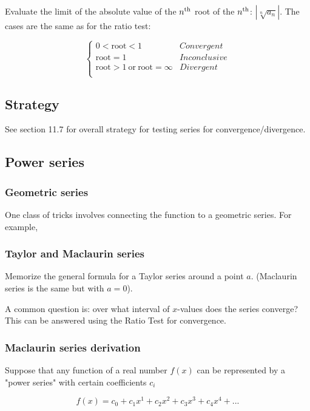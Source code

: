 Evaluate the limit of the absolute value of the $n^{\text{th}}$ root of the $n^{\text{th}}$: $|\sqrt[n]{a_n}|$. The cases are the same as for the ratio test:


$$
\begin{cases}
0 < \text{root} < 1&Convergent\\
\text{root} = 1&Inconclusive\\
\text{root} > 1 ~\text{or}~ \text{root} = \infty&Divergent\\
\end{cases}
$$


\subsection{Strategy}

See section 11.7 for overall strategy for testing series for convergence/divergence.


\subsection{Power series}

\subsubsection{Geometric series}

One class of tricks involves connecting the function to a geometric series. For example,

\subsubsection{Taylor and Maclaurin series}

Memorize the general formula for a Taylor series around a point $a$. (Maclaurin series is the same but with $a=0$).

A common question is: over what interval of $x$-values does the series converge? This can be answered using the Ratio Test for convergence.

\subsubsection{Maclaurin series derivation}

Suppose that any function of a real number $f(x)$ can be represented by a "power series" with certain coefficients $c_i$

$$
f(x) = c_0 + c_1x^1 + c_2x^2 + c_3x^3 + c_4x^4 + ...
$$

